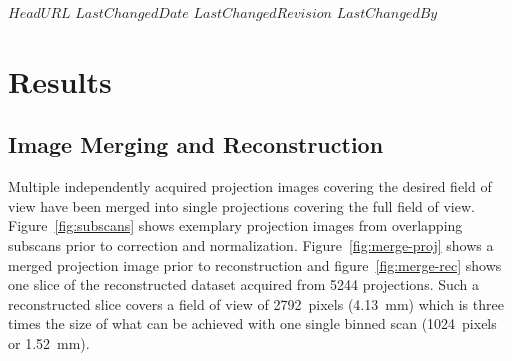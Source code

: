 \svnidlong
{$HeadURL$}
{$LastChangedDate$}
{$LastChangedRevision$}
{$LastChangedBy$}

\ifhtml
\else
\begin{center}
\end{center}
\fi

\section{Results}%
\label{sec:Results}%
\subsection{Image Merging and Reconstruction}%
\label{sec:Image Merging and Reconstruction}%
Multiple independently acquired projection images covering the desired field of view have been merged into single projections covering the full field of view. Figure~\ref{fig:subscans} shows exemplary projection images from overlapping subscans prior to correction and normalization. Figure~\ref{fig:merge-proj} shows a merged projection image prior to reconstruction and figure~\ref{fig:merge-rec} shows one slice of the reconstructed dataset acquired from 5244 projections. Such a reconstructed slice covers a field of view of \SI{2792}{pixels} (\SI{4.13}{\milli\meter}) which is three times the size of what can be achieved with one single binned scan (\SI{1024}{pixels} or \SI{1.52}{\milli\meter}). %

